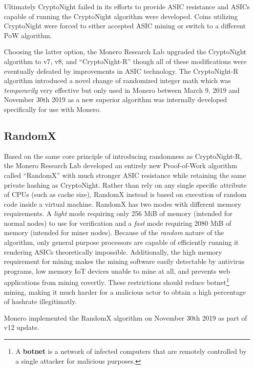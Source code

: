 Ultimately CryptoNight failed in its efforts to provide ASIC resistance and ASICs capable of running the CryptoNight algorithm were developed\cite{CryptoNight}. Coins utilizing CryptoNight were forced to either accepted ASIC mining or switch to a different PoW algorithm.

Choosing the latter option, the Monero Research Lab upgraded the CryptoNight algorithm to v7, v8, and ``CryptoNight-R'' though all of these modifications were eventually defeated by improvements in ASIC technology\cite{CryptoNight}. The CryptoNight-R algorithm introduced a novel change of randomized integer math which was \emph{temporarily} very effective but only used in Monero between March 9, 2019 and November 30th 2019 as a new superior algorithm was internally developed specifically for use with Monero\cite{monero_repo}.

\subsection{RandomX}
Based on the same core principle of introducing randomness as CryptoNight-R, the Monero Research Lab developed an entirely new Proof-of-Work algorithm called ``RandomX'' with much stronger ASIC resistance while retaining the same private hashing as CryptoNight\cite{randomx_article}. Rather than rely on any single specific attribute of CPUs (such as cache size), RandomX instead is based on execution of random code inside a virtual machine\cite{randomx_repo}. RandomX has two modes with different memory requirements. A \emph{light} mode requiring only 256 MiB of memory (intended for normal nodes) to use for verification and a \emph{fast} mode requiring 2080 MiB of memory (intended for miner nodes)\cite{randomx_repo}. Because of the \emph{random} nature of the algorithm, only general purpose processors are capable of efficiently running it rendering ASICs theoretically impossible\cite{randomx_article}. Additionally, the high memory requirement for mining makes the mining software easily detectable by antivirus programs, low memory IoT devices unable to mine at all, and prevents web applications from mining covertly. These restrictions should reduce botnet\footnote{A \textbf{botnet} is a network of infected computers that are remotely controlled by a single attacker for malicious purposes.} mining, making it much harder for a malicious actor to obtain a high percentage of hashrate illegitimatly\cite{randomx_medium}.

Monero implemented the RandomX algorithm on November 30th 2019 as part of v12 update\cite{monero_repo}.

